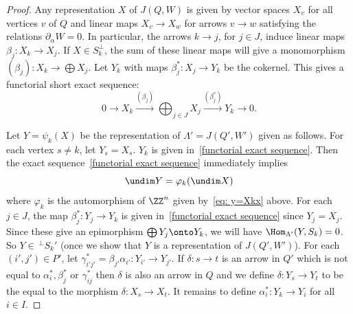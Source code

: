 \begin{proof}%



Any representation $X$ of $J(Q,W)$ is given by vector spaces $X_v$ for all vertices $v$ of $Q$ and linear maps $X_v\to X_w$ for arrows $v\to w$ satisfying the relations $\partial_\alpha W=0$. In particular, the arrows $k\to j$, for $j\in J$, induce linear maps $\beta_j:X_k\to X_j$. If $X\in S_k^\perp$, the sum of these linear maps will give a monomorphism $(\beta_j):X_k\to \bigoplus X_j$. Let $Y_k$ with maps $\beta_j^\ast:X_j\to Y_k$ be the cokernel. This gives a functorial short exact sequence:
\begin{equation}\label{functorial exact sequence}
	0\to X_k\xrightarrow{(\beta_j)}\bigoplus_{j\in J} X_j\xrightarrow{(\beta_j^\ast)}Y_k\to 0.
\end{equation}

Let $Y=\psi_k(X)$ be the representation of $\Lambda'=J(Q',W')$ given as follows. For each vertex $s\neq k$, let $Y_s=X_s$. $Y_k$ is given in~\eqref{functorial exact sequence}. Then the exact sequence~\eqref{functorial exact sequence} immediately implies
\[
	\undim Y=\varphi_k(\undim X)
\]
where $\varphi_k$ is the automorphism of $\ZZ^n$ given by~\eqref{eq: y=Xkx} above. For each $j\in J$, the map $\beta_j^\ast:Y_j\to Y_k$ is given in~\eqref{functorial exact sequence} since $Y_j=X_j$. Since these give an epimorphism $\bigoplus Y_j\onto Y_k$, we will have $\Hom_{\Lambda'}(Y,S_k)=0$. So $Y\in\,^{\perp}S_k'$ (once we show that $Y$ is a representation of $J(Q',W')$). For each $(i',j')\in P'$, let $\gamma_{i'j'}^\ast= \beta_{j'}\alpha_{i'}: Y_{i'}\to Y_{j'}$. If $\delta:s\to t$ is an arrow in $Q'$ which is not equal to $\alpha_i^\ast,\beta_j^\ast$ or $\gamma_{ij}^\ast$ then $\delta$ is also an arrow in $Q$ and we define $\delta:Y_s\to Y_t$ to be the equal to the morphism $\delta:X_s\to X_t$. It remains to define $\alpha_i^\ast:Y_k\to Y_i$ for all $i\in I$.



\end{proof}
